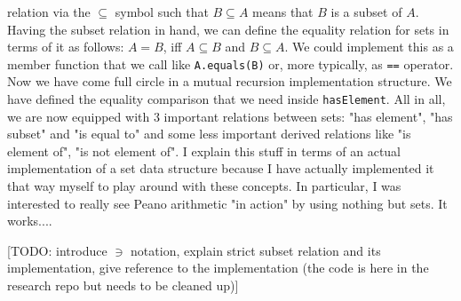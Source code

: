 relation via the $\subseteq$ symbol such that $B \subseteq A$ means that $B$ is a subset of $A$. Having the subset relation in hand, we can define the equality relation for sets in terms of it as follows: $A = B$, iff $A \subseteq B$ and $B \subseteq A$. We could implement this as a member function that we call like \verb|A.equals(B)| or, more typically, as \verb|==| operator. Now we have come full circle in a mutual recursion implementation structure. We have defined the equality comparison that we need inside \verb|hasElement|. All in all, we are now equipped with 3 important relations between sets: "has element", "has subset" and "is equal to" and some less important derived relations like "is element of", "is not element of". I explain this stuff in terms of an actual implementation of a set data structure because I have actually implemented it that way myself to play around with these concepts. In particular, I was interested to really see Peano arithmetic "in action" by using nothing but sets. It works....

[TODO: introduce $\ni$ notation, explain strict subset relation and its implementation, give reference to the implementation (the code is here in the research repo but needs to be cleaned up)]




